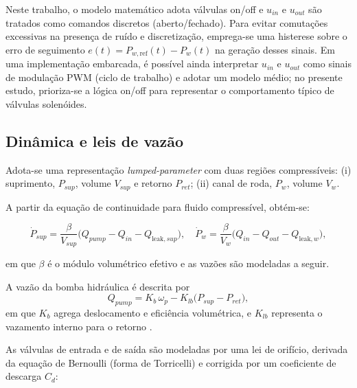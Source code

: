 Neste trabalho, o modelo matemático adota válvulas on/off e $u_{in}$ e $u_{out}$ são tratados como comandos discretos (aberto/fechado). Para evitar comutações excessivas na presença de ruído e discretização, emprega-se uma histerese sobre o erro de seguimento $e(t)=P_{w,\text{ref}}(t)-P_w(t)$ na geração desses sinais. Em uma implementação embarcada, é possível ainda interpretar $u_{in}$ e $u_{out}$ como sinais de modulação \gls{PWM} (ciclo de trabalho) e adotar um modelo médio; no presente estudo, prioriza-se a lógica on/off para representar o comportamento típico de válvulas solenóides.

\subsection{Dinâmica e leis de vazão}
\label{sec:controle-modelo-hidraulico-2p}

Adota-se uma representação \emph{lumped-parameter} com duas regiões compressíveis: (i) suprimento, $P_{sup}$, volume $V_{sup}$ e retorno $P_{ret}$; (ii) canal de roda, $P_w$, volume $V_w$.

A partir da equação de continuidade para fluido compressível, obtém-se:

\begin{equation}
    \dot{P}_{sup} = \frac{\beta}{V_{sup}}\Big(Q_{pump} - Q_{in} - Q_{\text{leak},sup}\Big),
    \quad
    \dot{P}_{w} = \frac{\beta}{V_{w}}\Big(Q_{in} - Q_{out} - Q_{\text{leak},w}\Big),
    \label{eq:din_press}
\end{equation}

em que $\beta$ é o módulo volumétrico efetivo e as vazões são modeladas a seguir.

A vazão da bomba hidráulica é descrita por
\begin{equation}
    Q_{pump} = K_b\,\omega_p - K_{lb}\big(P_{sup}-P_{ret}\big),
    \label{eq:qpump_2p}
\end{equation}
em que $K_b$ agrega deslocamento e eficiência volumétrica, e $K_{lb}$ representa o vazamento interno para o retorno \cite{MotorParametricDesign2023,WangBingbing2015}.

As válvulas de entrada e de saída são modeladas por uma lei de orifício, derivada da equação de Bernoulli (forma de Torricelli) e corrigida por um coeficiente de descarga $C_d$:

